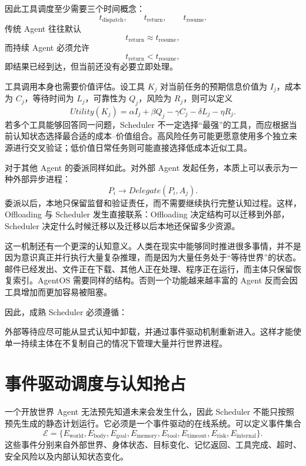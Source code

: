 因此工具调度至少需要三个时间概念：
\[
t_{\mathrm{dispatch}},
\qquad
t_{\mathrm{return}},
\qquad
t_{\mathrm{resume}}.
\]
传统 Agent 往往默认
\[
t_{\mathrm{return}}
\approx
t_{\mathrm{resume}},
\]
而持续 Agent 必须允许
\[
t_{\mathrm{return}}
<
t_{\mathrm{resume}},
\]
即结果已经到达，但当前还没有必要立即处理。

工具调用本身也需要价值评估。设工具 $K_j$ 对当前任务的预期信息价值为 $I_j$，成本为 $C_j$，等待时间为 $L_j$，可靠性为 $Q_j$，风险为 $R_j$，则可以定义
\[
Utility(K_j)
=
\alpha I_j
+
\beta Q_j
-
\gamma C_j
-
\delta L_j
-
\eta R_j.
\]
若多个工具能够回答同一问题，Scheduler 不一定选择“最强”的工具，而应根据当前认知状态选择最合适的成本--价值组合。高风险任务可能更愿意使用多个独立来源进行交叉验证；低价值日常任务则可能直接选择低成本近似工具。

对于其他 Agent 的委派同样如此。对外部 Agent 发起任务，本质上可以表示为一种外部异步进程：
\[
P_i
\rightarrow
Delegate(P_i,A_j).
\]
委派以后，本地只保留监督和验证责任，而不需要继续执行完整认知过程。这样，Offloading 与 Scheduler 发生直接联系：Offloading 决定结构可以迁移到外部，Scheduler 决定什么时候迁移以及迁移以后本地还保留多少资源。

这一机制还有一个更深的认知意义。人类在现实中能够同时推进很多事情，并不是因为意识真正并行执行大量复杂推理，而是因为大量任务处于“等待世界”的状态。邮件已经发出、文件正在下载、其他人正在处理、程序正在运行，而主体只保留恢复索引。AgentOS 需要同样的结构。否则一个功能越来越丰富的 Agent 反而会因工具增加而更加容易被阻塞。

因此，成熟 Scheduler 必须遵循：
\begin{statementbox}
\centering
{}
\end{statementbox}
外部等待应尽可能从显式认知中卸载，并通过事件驱动机制重新进入。这样才能使单一持续主体在不复制自己的情况下管理大量并行世界进程。

\section{事件驱动调度与认知抢占}

一个开放世界 Agent 无法预先知道未来会发生什么，因此 Scheduler 不能只按照预先生成的静态计划运行。它必须是一个事件驱动的在线系统。可以定义事件集合
\[
\mathcal E=
\{
E_{\mathrm{world}},
E_{\mathrm{body}},
E_{\mathrm{goal}},
E_{\mathrm{memory}},
E_{\mathrm{tool}},
E_{\mathrm{timeout}},
E_{\mathrm{risk}},
E_{\mathrm{internal}}
\}.
\]
这些事件分别来自外部世界、身体状态、目标变化、记忆返回、工具完成、超时、安全风险以及内部认知状态变化。

